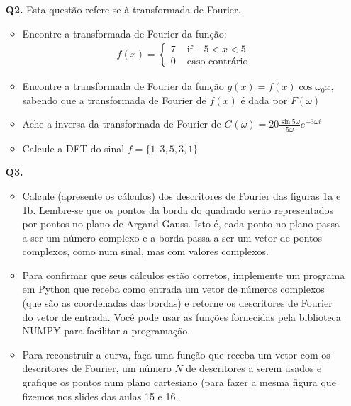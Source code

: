 \documentclass[12pt]{article}
\begin{document}
\begin{itemize}
\begin{itemize}
\end{itemize}
%
%
%
\item[{\bf Q2.}] Esta questão refere-se à transformada de Fourier.
\begin{itemize}
\item Encontre a transformada de Fourier da função:
\begin{eqnarray*}
f(x) = \left\{ \begin{array}{rl} 
 7 &\mbox{ if $-5 < x < 5$} \\
 0 &\mbox{ caso contrário}
       \end{array} \right.
\end{eqnarray*}
\item Encontre a transformada de Fourier da função $ g(x) = f(x)\cos
   \omega_0 x$, sabendo que a transformada de Fourier de $f(x)$ é dada
   por $F(\omega)$
\item Ache a inversa da transformada de Fourier de $G(\omega) =
  20\frac{\sin 5\omega}{5\omega}e^{-3\omega i}$
\item Calcule a DFT do sinal $f = \{1,3,5,3,1\}$
\end{itemize}
%
%
%
\item[{\bf Q3.}] 
\begin{itemize}
\item Calcule (apresente os cálculos) dos descritores de Fourier das
  figuras 1a e 1b. Lembre-se que os pontos da
  borda do quadrado serão representados por pontos no plano de
  Argand-Gauss. Isto é, cada ponto no plano passa a ser um número
  complexo e a borda passa a ser um vetor de pontos complexos, como
  num sinal, mas com valores complexos.
\item Para confirmar que seus cálculos estão corretos, implemente um
  programa em Python que receba como entrada um vetor de números
  complexos (que são as coordenadas das bordas) e retorne os
  descritores de Fourier do vetor de entrada. Você pode usar as
  funções fornecidas pela biblioteca NUMPY para facilitar a
  programação. 
\item Para reconstruir a curva, faça uma função que receba um vetor
  com os descritores de Fourier, um número $N$ de descritores a serem
  usados e grafique os pontos num plano cartesiano (para fazer a mesma 
figura que fizemos nos slides das aulas 15 e 16.
\end{itemize}
\begin{figure}[htb]
\centering
\begin{minipage}[b]{0.45\textwidth}
	\centering

\end{minipage}
\end{figure}
\end{itemize}
\end{document}

